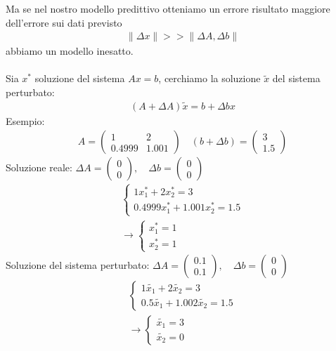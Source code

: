 \documentclass[a4paper,12pt]{article}
\begin{document}
Ma se nel nostro modello predittivo otteniamo un errore risultato maggiore dell'errore sui dati previsto
\begin{align*}
    \| \Delta x \| >> \| \Delta A, \Delta b \|
\end{align*}
abbiamo un modello inesatto.\\
\vspace{1em}\\
Sia $x^*$ soluzione del sistema $Ax=b$, cerchiamo la soluzione $\tilde{x}$ del sistema perturbato:
\begin{align*}
    (A+\Delta A)\tilde{x} = b + \Delta bx
\end{align*}
Esempio:
\begin{align*}
        A=\begin{pmatrix}
        1 & 2 \\
        0.4999 & 1.001
    \end{pmatrix} \quad (b+\Delta b) = \begin{pmatrix}
        3 \\ 1.5
    \end{pmatrix}
\end{align*}
Soluzione reale: $\Delta A= \begin{pmatrix}
    0 \\ 0
\end{pmatrix}, \quad \Delta b = \begin{pmatrix}
    0 \\0
\end{pmatrix}$
\begin{align*}
    \begin{cases}
        1x_1^* + 2x_2^* = 3 \\
        0.4999x_1^* + 1.001x_2^* = 1.5
    \end{cases} \\
    \rightarrow \begin{cases}
        x_1^* = 1 \\
        x_2^* = 1
    \end{cases}
\end{align*}
Soluzione del sistema perturbato: $\Delta A = \begin{pmatrix}
    0.1 \\
    0.1
\end{pmatrix}, \quad \Delta b = \begin{pmatrix}
    0 \\0
\end{pmatrix}$
\begin{align*}
    \begin{cases}
        1\tilde{x_1} + 2\tilde{x_2} = 3 \\
        0.5\tilde{x_1} + 1.002\tilde{x_2} = 1.5
    \end{cases} \\
    \rightarrow \begin{cases}
        \tilde{x_1}= 3 \\
        \tilde{x_2} = 0
    \end{cases}
\end{align*}
\end{document}
